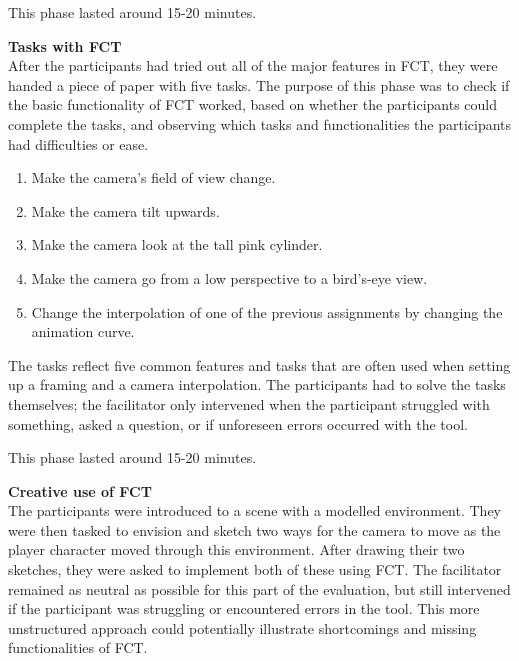This phase lasted around 15-20 minutes.

\textbf{Tasks with FCT}\\
After the participants had tried out all of the major features in FCT, they were handed a piece of paper with five tasks. The purpose of this phase was to check if  the basic functionality of FCT worked, based on whether the participants could complete the tasks, and observing which tasks and functionalities the participants had difficulties or ease.


\begin{enumerate}
\item Make the camera's field of view change.
\item Make the camera tilt upwards.
\item Make the camera look at the tall pink cylinder.
\item Make the camera go from a low perspective to a bird's-eye view.
\item Change the interpolation of one of the previous assignments by changing the animation curve.
\end{enumerate} 

The tasks reflect five common features and tasks that are often used when setting up a framing and a camera interpolation. The participants had to solve the tasks themselves; the facilitator only intervened when the participant struggled with something, asked a question, or if unforeseen errors occurred with the tool.

This phase lasted around 15-20 minutes.

\textbf{Creative use of FCT}\\
The participants were introduced to a scene with a modelled environment. They were then tasked to envision and sketch two ways for the camera to move as the player character moved through this environment. After drawing their two sketches, they were asked to implement both of these using FCT. The facilitator remained as neutral as possible for this part of the evaluation, but still intervened if the participant was struggling or encountered errors in the tool. This more unstructured approach could potentially illustrate shortcomings and missing functionalities of FCT.

